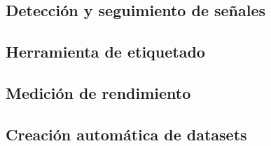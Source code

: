 \subsection{Detección y seguimiento de señales}	
	

\subsection{Herramienta de etiquetado}
	
	
\subsection{Medición de rendimiento}
	

\subsection{Creación automática de datasets}
	
